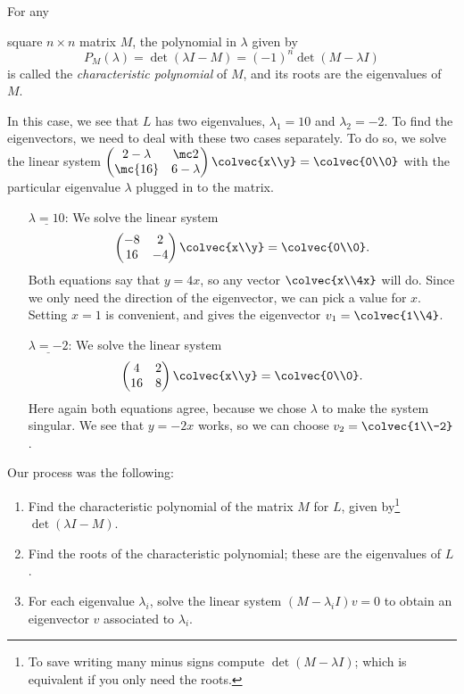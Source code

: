 \begin{example}
\hypertarget{characteristic_polynomial}{For any} square $n\times n$ matrix $M$, the polynomial in $\lambda$ given by \[P_M(\lambda)=\det (\lambda I-M)=(-1)^n \det (M-\lambda I)\] is called the \emph{characteristic polynomial} of $M$, and its roots are the eigenvalues of $M$.

In this case, we see that $L$ has two eigenvalues, $\lambda_1=10$ and $\lambda_2=-2$.  To find the eigenvectors, we need to deal with these two cases separately.
To do so, we solve the linear system $\begin{pmatrix}
2-\lambda & \mc2 \\
\mc{16} & 6-\lambda
\end{pmatrix}\colvec{x\\y}= \colvec{0\\0}$ with the particular eigenvalue $\lambda$ plugged in to the matrix.

\begin{itemize}
\item[$\underline{\lambda=10}$:]  We solve the linear system
\[
\begin{pmatrix}
-8 & 2 \\
16 & -4
\end{pmatrix}\colvec{x\\y}= \colvec{0\\0}.
\] 
Both equations say that $y=4x$, so any vector $\colvec{x\\4x}$ will do.  Since we only need the direction of the eigenvector, we can pick a value for $x$.  Setting $x=1$ is convenient, and gives the eigenvector $v_1=\colvec{1\\4}$.

\item[$\underline{\lambda=-2}$:]  We solve the linear system
\[
\begin{pmatrix}
4 & 2 \\
16 & 8
\end{pmatrix}\colvec{x\\y}= \colvec{0\\0}.
\] 
Here again both equations agree, because we chose $\lambda$ to make the system singular.  We see that $y=-2x$ works, so we can choose $v_2=\colvec{1\\-2}$.
\end{itemize}

Our process was the following:
\begin{enumerate}
\item Find the characteristic polynomial of the matrix $M$ for $L$, given by\footnote{To save writing many minus signs compute $\det(M-\lambda I)$; which is equivalent if you only need the roots.} $\det (\lambda I-M)$.
\item Find the roots of the characteristic polynomial; these are the eigenvalues of $L$.
\item For each eigenvalue $\lambda_i$, solve the linear system $(M-\lambda_i I)v=0$ to obtain an eigenvector $v$ associated to $\lambda_i$.
\end{enumerate}
\end{example}

